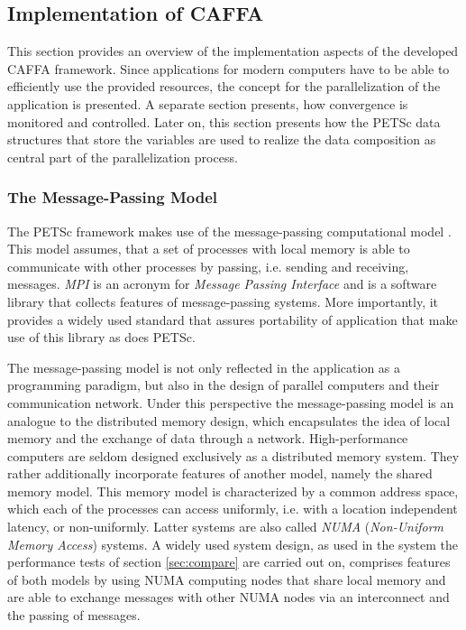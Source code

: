 \subsection{Implementation of CAFFA}
\label{sec:caffaimpl}

This section provides an overview of the implementation aspects of the developed CAFFA framework. Since applications for modern computers have to be able to efficiently use the provided resources, the concept for the parallelization of the application is presented. A separate section presents, how convergence is monitored and controlled. Later on, this section presents how the PETSc data structures that store the variables are used to realize the data composition as central part of the parallelization process.

\subsubsection{The Message-Passing Model}

The PETSc framework makes use of the message-passing computational model \cite{gropp99}. This model assumes, that a set of processes with local memory is able to communicate with other processes by passing, i.e. sending and receiving, messages. \emph{MPI} is an acronym for \emph{Message Passing Interface} and is a software library that collects features of message-passing systems. More importantly, it provides a widely used standard that assures portability of application that make use of this library as does PETSc. 

The message-passing model is not only reflected in the application as a programming paradigm, but also in the design of parallel computers and their communication network. Under this perspective the message-passing model is an analogue to the distributed memory design, which encapsulates the idea of local memory and the exchange of data through a network. High-performance computers are seldom designed exclusively as a distributed memory system. They rather additionally incorporate features of another model, namely the shared memory model. This memory model is characterized by a common address space, which each of the processes can access uniformly, i.e. with a location independent latency, or non-uniformly. Latter systems are also called \emph{NUMA} (\emph{Non-Uniform Memory Access}) systems. A widely used system design, as used in the system the performance tests of section \ref{sec:compare} are carried out on, comprises features of both models by using NUMA computing nodes that share local memory and are able to exchange messages with other NUMA nodes via an interconnect and the passing of messages.

